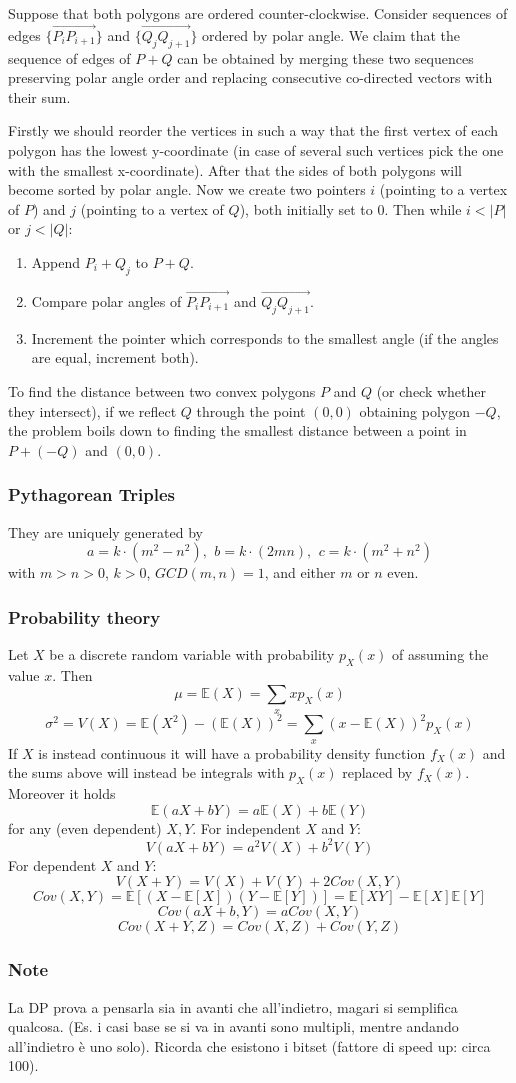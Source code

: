 Suppose that both polygons are ordered counter-clockwise. Consider sequences of edges $\{\overrightarrow{P_iP_{i+1}}\}$
and $\{\overrightarrow{Q_jQ_{j+1}}\}$ ordered by polar angle. We claim that the sequence of edges of $P + Q$ can be obtained by merging
these two sequences preserving polar angle order and replacing consecutive co-directed vectors with their sum.

Firstly we should reorder the vertices in such a way that the first vertex
of each polygon has the lowest y-coordinate (in case of several such vertices pick the one with the smallest x-coordinate). After that the sides of both polygons
will become sorted by polar angle.
Now we create two pointers $i$ (pointing to a vertex of $P$) and $j$ (pointing to a vertex of $Q$), both initially set to 0.
Then while $i < |P|$ or $j < |Q|$:
\begin{enumerate}
\item Append $P_i + Q_j$ to $P + Q$.
\item Compare polar angles of $\overrightarrow{P_iP_{i + 1}}$ and $\overrightarrow{Q_jQ_{j+1}}$.
\item Increment the pointer which corresponds to the smallest angle (if the angles are equal, increment both).
\end{enumerate}

To find the distance between two convex polygons $P$ and $Q$ (or check whether they intersect), if we reflect $Q$ through the point $(0, 0)$ obtaining polygon $-Q$, the problem boils down to finding the smallest distance between a point in
$P + (-Q)$ and $(0, 0)$.

\subsubsection{Pythagorean Triples}
 They are uniquely generated by $$a=k\cdot (m^{2}-n^{2}),\ \,b=k\cdot (2mn),\ \,c=k\cdot (m^{2}+n^{2})$$
 with $m > n > 0$, $k > 0$, $\mathit{GCD}(m,n)=1$, and either $m$ or $n$ even.

\subsubsection{Probability theory}
Let $X$ be a discrete random variable with probability $p_X(x)$ of assuming the value $x$. Then $$\mu=\mathbb{E}(X)=\sum_xxp_X(x)$$ $$\sigma^2=V(X)=\mathbb{E}(X^2)-(\mathbb{E}(X))^2=\sum_x(x-\mathbb{E}(X))^2p_X(x)$$ If $X$ is instead continuous it will have a probability density function $f_X(x)$ and the sums above will instead be integrals with $p_X(x)$ replaced by $f_X(x)$.
Moreover it holds $$\mathbb{E}(aX+bY) = a\mathbb{E}(X)+b\mathbb{E}(Y)$$ for any (even dependent) $X,Y$.
For independent $X$ and $Y$: $$V(aX+bY) = a^2V(X)+b^2V(Y)$$
For dependent $X$ and $Y$: $$V(X+Y) = V(X) + V(Y) + 2\mathit{Cov}(X,Y)$$ $$\mathit{Cov}(X,Y) = \mathbb{E}[(X-\mathbb{E}[X])(Y-\mathbb{E}[Y])] = \mathbb{E}[XY] - \mathbb{E}[X]\mathbb{E}[Y]$$
$$\mathit{Cov}(aX+b,Y) = a\mathit{Cov}(X,Y)$$ $$\mathit{Cov}(X+Y,Z) = \mathit{Cov}(X,Z)+\mathit{Cov}(Y,Z)$$

\subsubsection{Note} La DP prova a pensarla sia in avanti che all’indietro, magari si semplifica qualcosa. (Es. i casi base se si va in avanti sono multipli, mentre
andando all’indietro è uno solo). Ricorda che esistono i bitset (fattore di speed up: circa 100).
